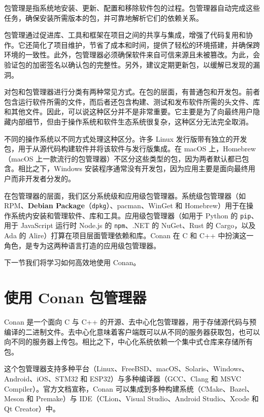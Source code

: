 \label{idx:721}
包管理是指系统地安装、更新、配置和移除软件包的过程。包管理器自动完成这些任务，确保安装所需版本的包，并可靠地解析它们的依赖关系。

\label{idx:722}
包管理通过促进库、工具和框架在项目之间的共享与集成，增强了代码复用和协作。它还简化了项目维护，节省了成本和时间，提供了轻松的环境搭建，并确保跨环境的一致性。此外，包管理器必须确保软件来自可信来源且未被篡改。为此，会验证包的加密签名以确认包的完整性。另外，建议定期更新包，以缓解已发现的漏洞。

对包和包管理器进行分类有两种常见方式。在包的层面，有普通包和开发包。前者包含运行软件所需的文件，而后者还包含构建、测试和发布软件所需的头文件、库和其他文件。因此，可以说这种区分并不是非常重要。它主要是为了向最终用户隐藏内部细节，但由于操作系统和软件生态系统很复杂，这种区分无法完全取消。

不同的操作系统以不同方式处理这种区分。许多 Linux 发行版带有独立的开发包，用于从源代码构建软件并将该软件与发行版集成。在 macOS 上，Homebrew（macOS 上一款流行的包管理器）不区分这些类型的包，因为两者默认都已包含。相比之下，Windows 安装程序通常没有开发包，因为应用主要是面向最终用户而非开发者分发的。

\label{idx:723}
在包管理器的层面，我们区分系统级和应用级包管理器。系统级包管理器（如 RPM、\textbf{Debian Package}（\texttt{dpkg}）、pacman、WinGet 和 Homebrew）用于在操作系统内安装和管理软件、库和工具。应用级包管理器（如用于 Python 的 \texttt{pip}、用于 JavaScript 运行时 Node.js 的 \texttt{npm}、.NET 的 NuGet、Rust 的 Cargo，以及 Ada 的 Alire）打算在项目层面管理依赖和库。Conan 在 C 和 C++ 中扮演这一角色，是专为这两种语言打造的应用级包管理器。

下一节我们将学习如何高效地使用 Conan。

\section{使用 Conan 包管理器}

\label{idx:724}
\label{idx:725}
Conan 是一个面向 C 与 C++ 的开源、去中心化包管理器，用于存储源代码与预编译的二进制文件。去中心化意味着客户端既可以从不同的服务器获取包，也可以向不同的服务器上传包。相比之下，中心化系统依赖一个集中式仓库来存储所有包。

这个包管理器支持多种平台（Linux、FreeBSD、macOS、Solaris、Windows、Android、iOS、STM32 和 ESP32）与多种编译器（GCC、Clang 和 MSVC Compiler）。官方文档宣称，Conan 可以集成到多种构建系统（CMake、Bazel、Meson 和 Premake）与 IDE（CLion、Visual Studio、Android Studio、Xcode 和 Qt Creator）中。


